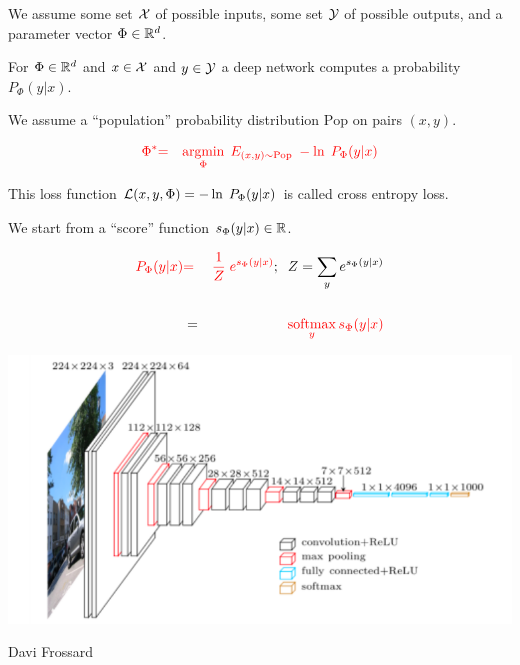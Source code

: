 {{\color{red} We assume some set ${\cal X}$ of possible inputs, some set ${\cal Y}$ of possible outputs,
and a parameter vector $\Phi \in \mathbb{R}^d$.}

\vfill
For $\Phi \in \mathbb{R}^d$ and $x \in {\cal X}$ and $y \in {\cal Y}$ a deep network computes a probability {\color{red} $P_\Phi(y|x)$}.



We assume a ``population'' probability distribution $\mathrm{Pop}$ on pairs $(x,y)$.

\vfill
\begin{eqnarray*}
{\color{red} \Phi^*} & {\color{red}  =} & {\color{red} \operatorname*{argmin}_\Phi \;E_{(x,y) \sim \mathrm{Pop}}\; -\ln \;P_\Phi(y|x)}
\end{eqnarray*}

\vfill
This loss function {\color{red} ${\cal L}(x,y,\Phi) = - \ln \;P_\Phi(y|x)$} is called {\color{red} cross entropy loss}.


We start from a ``score'' function $s_\Phi(y|x) \in \mathbb{R}$.

\vfill
\begin{eqnarray*}
  {\color{red} P_\Phi(y|x)} & {\color{red} =} & {\color{red} \frac{1}{Z}\;e^{s_\Phi(y|x)}};\;\; Z = \sum_y e^{s_\Phi(y|x)} \\
  \\
  & = & {\color{red} \operatorname*{softmax}_y s_\Phi(y|x)}
\end{eqnarray*}


\centerline{\includegraphics[width = 8.0in]{../images/VGG}}
\centerline{\large Davi Frossard}


}
